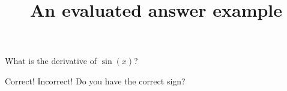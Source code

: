 \documentclass[hidesidemenu]{webquiz}
\title{An evaluated answer example}
\begin{document}
  \begin{question}     %
     What is the derivative of $\sin(x)$?

     \whenRight Correct!
     \whenWrong Incorrect! Do you have the correct sign?
  \end{question}
\end{document}
